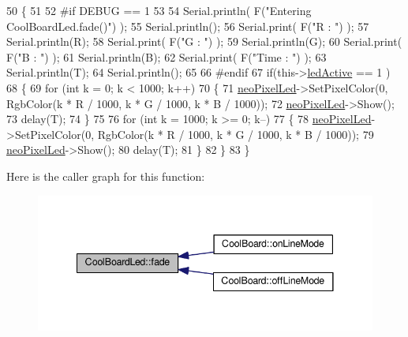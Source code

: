\begin{DoxyCode}
50 \{
51 
52 \textcolor{preprocessor}{#if DEBUG == 1}
53 
54     Serial.println( F(\textcolor{stringliteral}{"Entering CoolBoardLed.fade()"}) );
55     Serial.println();
56     Serial.print( F(\textcolor{stringliteral}{"R : "}) );
57     Serial.println(R);
58     Serial.print( F(\textcolor{stringliteral}{"G : "}) );
59     Serial.println(G);
60     Serial.print( F(\textcolor{stringliteral}{"B : "}) );
61     Serial.println(B);
62     Serial.print( F(\textcolor{stringliteral}{"Time : "}) );
63     Serial.println(T);
64     Serial.println();
65 
66 \textcolor{preprocessor}{#endif  }
67     \textcolor{keywordflow}{if}(this->\hyperlink{class_cool_board_led_aadd04d2ecf123247718d77f42fba7f08}{ledActive} == 1 )
68     \{
69         \textcolor{keywordflow}{for} (\textcolor{keywordtype}{int} k = 0; k < 1000; k++) 
70         \{
71             \hyperlink{class_cool_board_led_ac2c13fa462a010cd9242bf297c013923}{neoPixelLed}->SetPixelColor(0, RgbColor(k * R / 1000, k * G / 1000, k * B / 1000));
72             \hyperlink{class_cool_board_led_ac2c13fa462a010cd9242bf297c013923}{neoPixelLed}->Show();
73             delay(T);
74         \}
75         
76         \textcolor{keywordflow}{for} (\textcolor{keywordtype}{int} k = 1000; k >= 0; k--) 
77         \{
78             \hyperlink{class_cool_board_led_ac2c13fa462a010cd9242bf297c013923}{neoPixelLed}->SetPixelColor(0, RgbColor(k * R / 1000, k * G / 1000, k * B / 1000));
79             \hyperlink{class_cool_board_led_ac2c13fa462a010cd9242bf297c013923}{neoPixelLed}->Show();
80             delay(T);
81         \}
82     \}
83 \}
\end{DoxyCode}
Here is the caller graph for this function\+:\nopagebreak
\begin{figure}[H]
\begin{center}
\leavevmode
\includegraphics[width=341pt]{de/dc0/class_cool_board_led_af1cacbaa88db8bcf6042c1083ba41155_icgraph}
\end{center}
\end{figure}
\mbox{\label{class_cool_board_led_ab778f5e7bed0ab74e3906d82110493c3}} 
